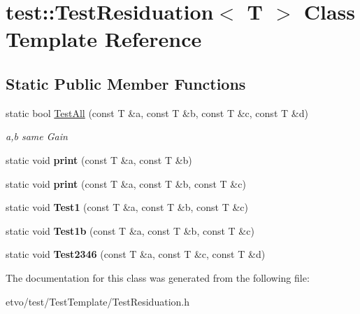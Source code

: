 \hypertarget{classtest_1_1_test_residuation}{}\section{test\+:\+:Test\+Residuation$<$ T $>$ Class Template Reference}
\label{classtest_1_1_test_residuation}
\subsection*{Static Public Member Functions}
\begin{DoxyCompactItemize}
\item 
\mbox{\label{classtest_1_1_test_residuation_afc11c8f180a0b5f93fce7c738a8d2f9a}} 
static bool \mbox{\hyperlink{classtest_1_1_test_residuation_afc11c8f180a0b5f93fce7c738a8d2f9a}{Test\+All}} (const T \&a, const T \&b, const T \&c, const T \&d)
\begin{DoxyCompactList}\small\item\em a,b same Gain \end{DoxyCompactList}\item 
\mbox{\label{classtest_1_1_test_residuation_a70446e1e7bfe421f84349c9075d75caf}} 
static void {\bfseries print} (const T \&a, const T \&b)
\item 
\mbox{\label{classtest_1_1_test_residuation_a04b510ec0574c9d67d8e2e9a126ef038}} 
static void {\bfseries print} (const T \&a, const T \&b, const T \&c)
\item 
\mbox{\label{classtest_1_1_test_residuation_ac80a94c9e4658f4e4731eb3c8e48db82}} 
static void {\bfseries Test1} (const T \&a, const T \&b, const T \&c)
\item 
\mbox{\label{classtest_1_1_test_residuation_a8db6c698f58ad2c61a7950bdb10780ea}} 
static void {\bfseries Test1b} (const T \&a, const T \&b, const T \&c)
\item 
\mbox{\label{classtest_1_1_test_residuation_ab9354022dceafa57f831eea47e4aac75}} 
static void {\bfseries Test2346} (const T \&a, const T \&c, const T \&d)
\end{DoxyCompactItemize}


The documentation for this class was generated from the following file\+:\begin{DoxyCompactItemize}
\item 
etvo/test/\+Test\+Template/Test\+Residuation.\+h\end{DoxyCompactItemize}
